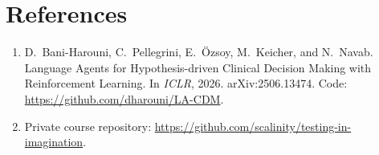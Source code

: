 \documentclass[11pt,letterpaper]{article}
\begin{document}
\section*{References}
\begin{enumerate}[leftmargin=1.6em,itemsep=0.35em]
  \item D.~Bani-Harouni, C.~Pellegrini, E.~\"{O}zsoy, M.~Keicher, and N.~Navab.
  \newblock Language Agents for Hypothesis-driven Clinical Decision Making with Reinforcement Learning.
  \newblock In \emph{ICLR}, 2026. arXiv:2506.13474. Code: \url{https://github.com/dharouni/LA-CDM}.
  \item Private course repository: \url{https://github.com/scalinity/testing-in-imagination}.
\end{enumerate}
\end{document}
